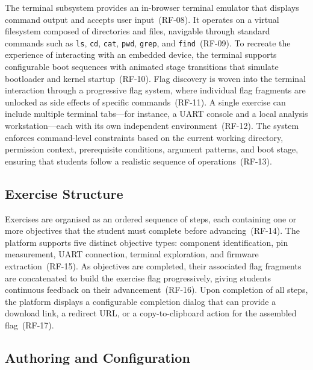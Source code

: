 The terminal subsystem provides an in-browser terminal emulator that displays command output and accepts user input~(RF-08). It operates on a virtual filesystem composed of directories and files, navigable through standard commands such as \texttt{ls}, \texttt{cd}, \texttt{cat}, \texttt{pwd}, \texttt{grep}, and \texttt{find}~(RF-09). To recreate the experience of interacting with an embedded device, the terminal supports configurable boot sequences with animated stage transitions that simulate bootloader and kernel startup~(RF-10). Flag discovery is woven into the terminal interaction through a progressive flag system, where individual flag fragments are unlocked as side effects of specific commands~(RF-11). A single exercise can include multiple terminal tabs---for instance, a UART console and a local analysis workstation---each with its own independent environment~(RF-12). The system enforces command-level constraints based on the current working directory, permission context, prerequisite conditions, argument patterns, and boot stage, ensuring that students follow a realistic sequence of operations~(RF-13).

\subsection{Exercise Structure}\label{subsec:req-exercise}

Exercises are organised as an ordered sequence of steps, each containing one or more objectives that the student must complete before advancing~(RF-14). The platform supports five distinct objective types: component identification, pin measurement, UART connection, terminal exploration, and firmware extraction~(RF-15). As objectives are completed, their associated flag fragments are concatenated to build the exercise flag progressively, giving students continuous feedback on their advancement~(RF-16). Upon completion of all steps, the platform displays a configurable completion dialog that can provide a download link, a redirect URL, or a copy-to-clipboard action for the assembled flag~(RF-17).

\subsection{Authoring and Configuration}\label{subsec:req-authoring}

